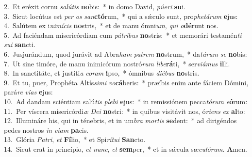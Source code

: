 {2.~}Et eréxit cornu \textit{sa}\textit{lú}\textit{tis} \textbf{no}bis:~* in domo David, \textit{pú}\textit{e}\textit{ri} \textbf{su}i.\\
{3.~}Sicut locútus est \textit{per} \textit{os} \textit{san}\textbf{ctó}rum,~* qui a sǽculo sunt, pro\textit{phe}\textit{tá}\textit{rum} \textbf{e}jus:\\
{4.~}Salútem ex i\textit{ni}\textit{mí}\textit{cis} \textbf{no}stris,~* et de manu ómni\textit{um}, \textit{qui} \textit{o}\textbf{dé}runt nos.\\
{5.~}Ad faciéndam misericórdiam cum \textit{pá}\textit{tri}\textit{bus} \textbf{no}stris:~* et memorári testamén\textit{ti} \textit{su}\textit{i} \textbf{san}cti.\\
{6.~}Jusjurándum, quod jurávit ad Abra\textit{ham} \textit{pa}\textit{trem} \textbf{no}strum,~* da\textit{tú}\textit{rum} \textit{se} \textbf{no}bis:\\
{7.~}Ut sine timóre, de manu inimicórum nostró\textit{rum} \textit{li}\textit{be}\textbf{rá}ti,~* ser\textit{vi}\textit{á}\textit{mus} \textbf{il}li.\\
{8.~}In sanctitáte, et justíti\textit{a} \textit{co}\textit{ram} \textbf{i}pso,~* ómnibus \textit{di}\textit{é}\textit{bus} \textbf{no}stris.\\
{9.~}Et tu, puer, Prophéta Altís\textit{si}\textit{mi} \textit{vo}\textbf{cá}beris:~* præíbis enim ante fáciem Dómini, pará\textit{re} \textit{vi}\textit{as} \textbf{e}jus:\\
{10.~}Ad dandam sciéntiam salú\textit{tis} \textit{ple}\textit{bi} \textbf{e}jus:~* in remissiónem pecca\textit{tó}\textit{rum} \textit{e}\textbf{ó}rum:\\
{11.~}Per víscera misericórdi\textit{æ} \textit{De}\textit{i} \textbf{no}stri:~* in quibus visitávit nos, ó\textit{ri}\textit{ens} \textit{ex} \textbf{al}to:\\
{12.~}Illumináre his, qui in ténebris, et in um\textit{bra} \textit{mor}\textit{tis} \textbf{se}dent:~* ad dirigéndos pedes nostros \textit{in} \textit{vi}\textit{am} \textbf{pa}cis.\\
{13.~}Glória \textit{Pa}\textit{tri}, \textit{et} \textbf{Fí}lio,~* et Spi\textit{rí}\textit{tu}\textit{i} \textbf{San}cto.\\
{14.~}Sicut erat in princípio, \textit{et} \textit{nunc}, \textit{et} \textbf{sem}per,~* et in sǽcula sæ\textit{cu}\textit{ló}\textit{rum}. \textbf{A}men.\\
